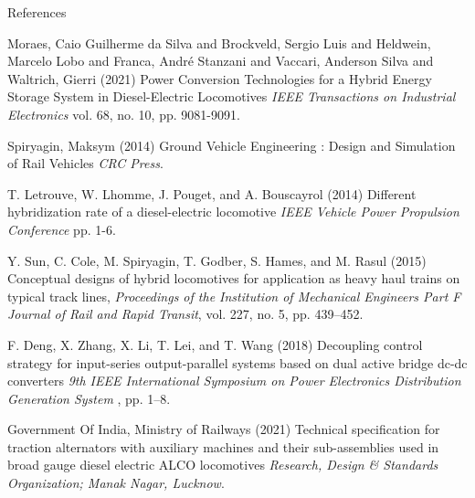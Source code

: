 \documentclass[aspectratio=169]{beamer}
\begin{document}
\begin{frame}[allowframebreaks]{References}

\begin{thebibliography}{9}
	
Moraes, Caio Guilherme da Silva and Brockveld, Sergio Luis and Heldwein, Marcelo Lobo and Franca, André Stanzani and Vaccari, Anderson Silva and Waltrich, Gierri (2021)
\newblock Power Conversion Technologies for a Hybrid Energy Storage System in Diesel-Electric Locomotives
\newblock \emph{IEEE Transactions on Industrial Electronics}  vol. 68, no. 10, pp. 9081-9091.


Spiryagin, Maksym (2014)
\newblock Ground Vehicle Engineering : Design and Simulation of Rail Vehicles
\newblock \emph{CRC Press}.
	
	T. Letrouve, W. Lhomme, J. Pouget, and A. Bouscayrol (2014)
	\newblock Different hybridization rate of a diesel-electric locomotive
	\newblock \emph{IEEE Vehicle Power Propulsion Conference}  pp. 1-6.
	
	
	
Y. Sun, C. Cole, M. Spiryagin, T. Godber, S. Hames, and M. Rasul (2015)
\newblock Conceptual designs of hybrid locomotives for application as heavy haul
trains on typical track lines,
\newblock \emph{Proceedings of the Institution of Mechanical Engineers Part F Journal of Rail and Rapid Transit}, vol. 227, no. 5,
pp. 439–452.

	
F. Deng, X. Zhang, X. Li, T. Lei, and T. Wang (2018)
\newblock Decoupling control strategy for input-series output-parallel systems based on dual active bridge dc-dc converters
\newblock \emph{9th IEEE International Symposium on Power Electronics Distribution Generation System} , pp. 1–8.	
	
	
	Government Of India, Ministry of Railways (2021)
	\newblock Technical specification for traction alternators with auxiliary machines and their sub-assemblies used in broad gauge diesel electric ALCO locomotives
	\newblock \emph{Research, Design \& Standards Organization; Manak Nagar, Lucknow}.
	
\end{thebibliography}
\end{frame}

\begin{frame}
	\begin{columns}
		\column{2.5cm}
		\column{5cm}
		\Huge{~}
		\column{2.5cm}
	\end{columns}
\end{frame}
\end{document}
